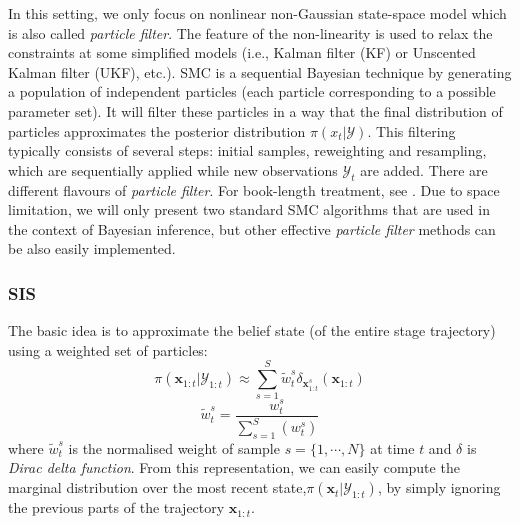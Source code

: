 In this setting, we only focus on nonlinear non-Gaussian state-space model which is also called \textit{particle filter}. The feature of the non-linearity is used to relax the constraints at some simplified models (i.e., Kalman filter (KF) or Unscented Kalman filter (UKF), etc.). \acrshort{SMC} is a sequential Bayesian technique by generating a population of independent particles (each particle corresponding to a possible parameter set). It will filter these particles in a way that the final distribution of particles approximates the posterior distribution $\pi({x}_{t}|\mathcal{Y})$. This filtering typically consists of several steps: initial samples, reweighting and resampling, which are sequentially applied while new observations $\mathcal{Y}_{t}$ are added. There are different flavours of \textit{particle filter}. For book-length treatment, see \cite{murphy2012}. Due to space limitation, we will only present two standard \acrshort{SMC} algorithms that are used in the context of Bayesian inference, but other effective \textit{particle filter} methods can be also easily implemented.


\subsubsection{\acrfull{SIS}}
The basic idea is to approximate the belief state (of the entire stage trajectory) using a weighted set of particles:
\begin{equation}
    \label{eq: PF-SIS}
\pi(\boldsymbol{x}_{1:t}|\mathcal{Y}_{1:t})
\approx 
\sum_{s=1}^{S} 
\tilde{w}_{t}^{s}
\delta_{\boldsymbol{x}_{1:t}^{s}}(\boldsymbol{x}_{1:t})
\end{equation}
\begin{equation}
    \label{eq: PF-SIS-Normalized_weight}
\tilde{w}_t^s=\frac{w_t^s}{\sum_{s=1}^{S}{(w_t^s)}}
\end{equation}
where $\tilde{w}_{t}^{s}$ is the normalised weight of sample $s = \{1,\cdots,N\}$ at time $t$ and  $\delta$ is \textit{Dirac delta function}. From this representation, we can easily compute the marginal distribution over the most recent state,$\pi(\boldsymbol{x}_{t}|\mathcal{Y}_{1:t})$, by simply ignoring the previous parts of the trajectory $\boldsymbol{x}_{1:t}$.

